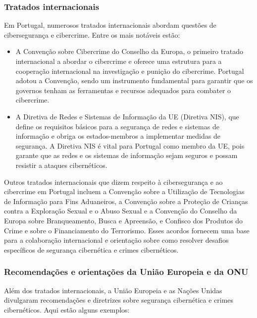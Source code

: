 \subsubsection{Tratados internacionais}

Em Portugal, numerosos tratados internacionais abordam questões de cibersegurança e cibercrime. Entre os mais notáveis estão:

\begin{itemize}
  \item A Convenção sobre Cibercrime do Conselho da Europa, o primeiro tratado internacional a abordar o cibercrime e oferece uma estrutura para a cooperação internacional na investigação e punição do cibercrime. Portugal adotou a Convenção, sendo um instrumento fundamental para garantir que os governos tenham as ferramentas e recursos adequados para combater o cibercrime.
  \item A Diretiva de Redes e Sistemas de Informação da UE (Diretiva NIS), que define os requisitos básicos para a segurança de redes e sistemas de informação e obriga os estados-membros a implementar medidas de segurança. A Diretiva NIS é vital para Portugal como membro da UE, pois garante que as redes e os sistemas de informação sejam seguros e possam resistir a ataques cibernéticos.
\end{itemize}

Outros tratados internacionais que dizem respeito à cibersegurança e ao cibercrime em Portugal incluem a Convenção sobre a Utilização de Tecnologias de Informação para Fins Aduaneiros, a Convenção sobre a Proteção de Crianças contra a Exploração Sexual e o Abuso Sexual e a Convenção do Conselho da Europa sobre Branqueamento, Busca e Apreensão, e Confisco dos Produtos do Crime e sobre o Financiamento do Terrorismo. Esses acordos fornecem uma base para a colaboração internacional e orientação sobre como resolver desafios específicos de segurança cibernética e crimes cibernéticos.

\subsubsection{Recomendações e orientações da União Europeia e da ONU}

Além dos tratados internacionais, a União Europeia e as Nações Unidas divulgaram recomendações e diretrizes sobre segurança cibernética e crimes cibernéticos. Aqui estão alguns exemplos:

